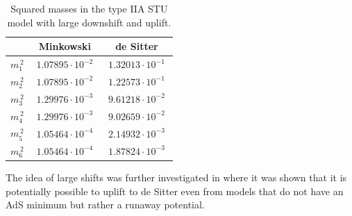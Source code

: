 \documentclass[a4paper,12pt]{report}
\begin{document}
\begin{table}[htb]
\centering
\begin{tabular}{|c|c|c|}\hline
&  Minkowski  & de Sitter \\\hline
$m_1^{\,2} $ & $\; 1.07895 \cdot 10^{-2} \;$ & $\; 1.32013 \cdot 10^{-1} \;$  \\\hline
$m_2^{\,2} $ & $\; 1.07895 \cdot 10^{-2} \;$ & $\; 1.22573 \cdot 10^{-1} \;$ \\\hline
$m_3^{\,2} $ & $\; 1.29976 \cdot 10^{-3} \;$ & $\; 9.61218 \cdot 10^{-2} \;$ \\\hline
$m_4^{\,2} $ & $\; 1.29976 \cdot 10^{-3} \;$ & $\; 9.02659 \cdot 10^{-2} \;$ \\\hline
$m_5^{\,2} $ & $\; 1.05464 \cdot 10^{-4} \;$ & $\; 2.14932 \cdot 10^{-3} \;$ \\\hline
$m_6^{\,2} $ & $\; 1.05464 \cdot 10^{-4} \;$ & $\; 1.87824 \cdot 10^{-3} \;$ \\\hline
\end{tabular}
\caption{  Squared masses in the type IIA STU model with large downshift and uplift. }
\label{tab:largemass}
\end{table}

The idea of large shifts was further investigated in \cite{Linde:2020mdk} where it was shown that it is potentially possible to uplift to de Sitter even from models that do not have an AdS minimum but rather a runaway potential. 
\end{document}
